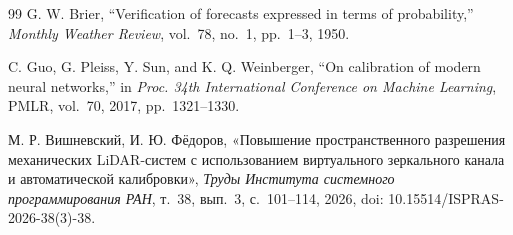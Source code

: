 \documentclass{misisarticle}
\begin{document}
\begin{thebibliography}{99}
 G. W. Brier, “Verification of forecasts expressed in terms of probability,” \textit{Monthly Weather Review}, vol.~78, no.~1, pp.~1--3, 1950.

 C. Guo, G. Pleiss, Y. Sun, and K. Q. Weinberger, “On calibration of modern neural networks,” in \textit{Proc. 34th International Conference on Machine Learning}, PMLR, vol.~70, 2017, pp.~1321--1330.

 М. Р. Вишневский, И. Ю. Фёдоров, «Повышение пространственного разрешения механических LiDAR-систем с использованием виртуального зеркального канала и автоматической калибровки», \textit{Труды Института системного программирования РАН}, т.~38, вып.~3, с.~101--114, 2026, doi: 10.15514/ISPRAS-2026-38(3)-38.

\end{thebibliography}
\end{document}
